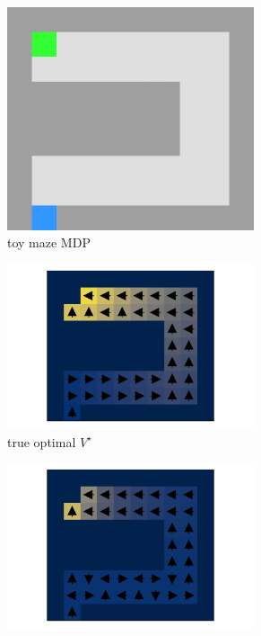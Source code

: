 \begin{figure}
\begin{subfigure}{0.233\textwidth}
    \centering
    \includegraphics[width=0.8\textwidth]{iql/images/maze/umaze.png}
    \caption{toy maze MDP \label{fig:umaze}}
\end{subfigure}%
\hspace{0.01mm}
\begin{subfigure}{0.235\textwidth}
    \centering
    \includegraphics[width=0.8\textwidth]{iql/images/maze/umaze_ql.pdf}
    \caption{true optimal $V^\star$}
\end{subfigure}%
\hspace{0.01mm}
\begin{subfigure}{0.235\textwidth}
    \centering
    \includegraphics[width=0.8\textwidth]{iql/images/maze/maze_2.pdf}

\end{subfigure}
\end{figure}

